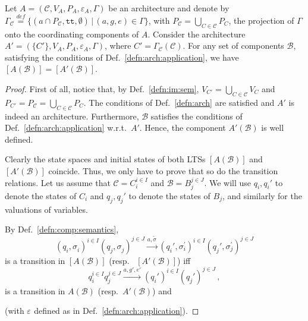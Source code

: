 \documentclass{llncs}
\newcommand{\defn}[1]{Def.~\ref{defn:#1}}
\newcommand{\cB}{\ensuremath{\mathcal{B}}}
\newcommand{\cC}{\ensuremath{\mathcal{C}}}
\newcommand{\wrt}[1][\ ]{w.r.t.#1}
\newcommand{\resp}[1][\ ]{resp.#1}
\newcommand{\bydef}[1]{\ensuremath{\stackrel{\mathit{\scriptscriptstyle def}}{#1}}}
\newcommand{\setdef}[2]{\ensuremath{\{{#1}\,|\,{#2}\}}}
\newcommand{\goesto}[2][]{\ensuremath{\xrightarrow[#1]{#2}}}
\newcommand{\true} {\ensuremath{\mathtt{t\!t}}}
\newcommand{\noop} {\ensuremath{\emptyset}} %
\newcommand{\val}[3][]{\ensuremath{#1{\sigma}^{#2}_{#3}}}
\newcommand{\export}[1][]{\ensuremath{\varepsilon_{#1}}}
\newcommand{\valdiff}[2]{\ensuremath{#1 \triangle #2}}
\newcommand{\semopen}[1]{\ensuremath{[{#1}]}}
\begin{document}
\begin{lemma}
  \label{lem:onlyone}
  Let $A = (\cC, V_A, P_A, \export[A], \Gamma)$ be an architecture and denote
  by $\Gamma_\cC \bydef{=}
%
  \setdef{
    (a \cap P_\cC, \true, \noop)
  }{
    (a, g, e) \in \Gamma
  }$, with $P_\cC = \bigcup_{C \in \cC} P_C$,
%  
  the projection of $\Gamma$ onto the coordinating components of
  $A$.  Consider the architecture $A' = (\{C'\}, V_A, P_A, \export[A],
  \Gamma)$, where $C' = \Gamma_\cC(\cC)$.  For any set of
  components $\cB$, satisfying the conditions of
  \defn{arch:application}, we have
  $\semopen{A(\cB)} = \semopen{A'(\cB)}$.
\end{lemma}
%
\begin{proof}
  First of all, notice that, by \defn{im:sem},
  $V_{C'} = \bigcup_{C \in \cC} V_C$ and $P_{C'} = P_\cC = \bigcup_{C \in \cC} P_C$.
  The conditions of \defn{arch} are satisfied and $A'$ is indeed
  an architecture.  Furthermore, $\cB$ satisfies the conditions
  of \defn{arch:application} \wrt $A'$.  Hence, the component
  $A'(\cB)$ is well defined.

  Clearly the state spaces and initial states %
  of both LTSs $\semopen{A(\cB)}$ and $\semopen{A'(\cB)}$
  coincide.  Thus, we only have to prove that so do the
  transition relations.  Let us assume that
  $\cC = C_i^{i \in I}$ and $\cB = B_j^{j \in J}$.
  We will use $q_i, q_i'$ to denote the states of
  $C_i$ and $q_j, q_j'$ to denote the states of $B_j$,
  and similarly for the valuations of variables.

  By \defn{comp:semantics},
%
  \begin{equation}
    \label{eq:lem1:trans:sem}
    (q_i, \val{}{i})^{i \in I} (q_j, \val{}{j})^{j \in J}
    \goesto{a, \val[\tilde]{}{}}
    (q_i', \val{\prime}{i})^{i \in I}
    (q_j', \val{\prime}{j})^{j \in J}
  \end{equation}
%  
  is a transition in $\semopen{A(\cB)}$ (\resp
  $\semopen{A'(\cB)}$) iff
%
  \begin{equation}
    \label{eq:lem1:trans}
    q_i^{i \in I} q_j^{j \in J}
    \goesto{a, g', e'}
    (q_i')^{i \in I} (q_j')^{j \in J}
    \,,
  \end{equation}
%
  is a transition in $A(\cB)$ (\resp $A'(\cB)$) and
%
%
  (with $\export$ defined as in \defn{arch:application}).


\end{proof}
\end{document}
